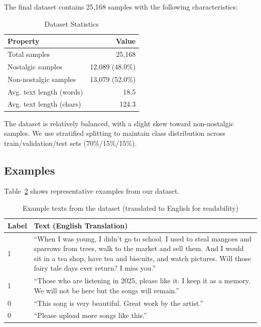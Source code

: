 \documentclass[conference]{IEEEtran}
\begin{document}
The final dataset contains 25,168 samples with the following characteristics:

\begin{table}[h]
\centering
\caption{Dataset Statistics}
\label{tab:dataset_stats}
\begin{tabular}{lr}
\toprule
\textbf{Property} & \textbf{Value} \\
\midrule
Total samples & 25,168 \\
Nostalgic samples & 12,089 (48.0\%) \\
Non-nostalgic samples & 13,079 (52.0\%) \\
Avg. text length (words) & 18.5 \\
Avg. text length (chars) & 124.3 \\
\bottomrule
\end{tabular}
\end{table}

The dataset is relatively balanced, with a slight skew toward non-nostalgic samples. We use stratified splitting to maintain class distribution across train/validation/test sets (70\%/15\%/15\%).

\subsection{Examples}

Table~\ref{tab:examples} shows representative examples from our dataset.

\begin{table}[t]
\centering
\caption{Example texts from the dataset (translated to English for readability)}
\label{tab:examples}
\begin{tabular}{p{0.1cm}p{14cm}}
\toprule
\textbf{Label} & \textbf{Text (English Translation)} \\
\midrule
1 & ``When I was young, I didn't go to school. I used to steal mangoes and sparrows from trees, walk to the market and sell them. And I would sit in a tea shop, have tea and biscuits, and watch pictures. Will those fairy tale days ever return? I miss you.'' \\
\midrule
1 & ``Those who are listening in 2025, please like it. I keep it as a memory. We will not be here but the songs will remain.'' \\
\midrule
0 & ``This song is very beautiful. Great work by the artist.'' \\
\midrule
0 & ``Please upload more songs like this.'' \\
\bottomrule
\end{tabular}
\end{table}
\end{document}
